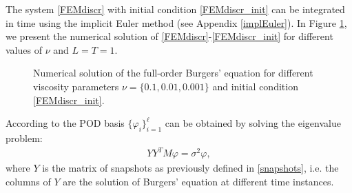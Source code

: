 The system \eqref{FEMdiscr} with initial condition \eqref{FEMdiscr_init} can be integrated in time using the implicit Euler method (see Appendix \ref{implEuler}). In Figure \ref{FullNumSol}, we present the numerical solution of \eqref{FEMdiscr}-\eqref{FEMdiscr_init} for different values of $\nu$ and $L = T = 1$.
\begin{figure}[H]
\centering
{}\hfill
{}\hfill
{}\hfill
\caption{Numerical solution of the full-order Burgers' equation for different viscosity parameters $\nu = \{0.1, 0.01, 0.001\}$ and initial condition \eqref{FEMdiscr_init}.}\label{FullNumSol}
\end{figure}
According to \cite{KV99} the POD basis $\{\varphi_i\}_{i=1}^\ell$ can be obtained by solving the eigenvalue problem:
\begin{align}
\label{PODviaEW}
Y Y^T M \varphi = \sigma^2 \varphi,
\end{align}
where $Y$ is the matrix of snapshots as previously defined in \eqref{snapshots}, i.e. the columns of $Y$ are the solution of Burgers' equation at different time instances.

